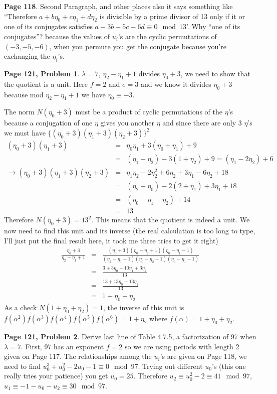 \documentclass[aps,preprint,preprintnumbers,nofootinbib,showpacs,prd]{revtex4-1}
\newcommand{\nbea}{\begin{eqnarray*}}
\newcommand{\neea}{\end{eqnarray*}}
\begin{document}
{\bf Page 118}. Second Paragraph, and other places also it says something like ``Therefore $a + b\eta_0 + c\eta_1 + d\eta_2$ is divisible by a prime divisor of 13 only if it or one of its conjugates satisfies $a - 3b - 5c - 6d \equiv 0 \mod{13}$'. Why ``one of its conjugates''? because the values of $u_i$'s are the cyclic permutations of $(-3,-5,-6)$, when you permute you get the conjugate because you're exchanging the $\eta_i$'s.

{\bf Page 121, Problem 1}. $\lambda = 7$, $\eta_2 - \eta_1 + 1$ divides $\eta_0 + 3$, we need to show that the quotient is a unit. Here $f = 2$ and $e = 3$ and we know it divides $\eta_0 + 3$ because mod $\eta_2 - \eta_1 + 1$ we have $\eta_0 \equiv -3$.

The norm $N(\eta_0 + 3)$ must be a product of cyclic permutations of the $\eta$'s because a conjugation of one $\eta$ gives you another $\eta$ and since there are only 3 $\eta$'s we must have $\{(\eta_0 + 3)(\eta_1 + 3)(\eta_2 + 3)\}^2$
%
\nbea
(\eta_0 + 3)(\eta_1 + 3) & = & \eta_0\eta_1 + 3(\eta_0 + \eta_1) + 9 \\
& = & (\eta_1 + \eta_2) - 3(1 + \eta_2) + 9 = (\eta_1 - 2\eta_2) + 6 \\
\to (\eta_0 + 3)(\eta_1 + 3)(\eta_2 + 3) & = & \eta_1\eta_2 - 2\eta_2^2 + 6\eta_2 + 3\eta_1 - 6\eta_2 + 18 \\
& = & (\eta_2 + \eta_0) -2(2 + \eta_1) + 3\eta_1 + 18 \\
& = & (\eta_0 + \eta_1 + \eta_2) + 14 \\
& = & 13
\neea
%
Therefore $N(\eta_0 + 3) = 13^2$. This means that the quotient is indeed a unit. We now need to find this unit and its inverse (the real calculation is too long to type, I'll just put the final result here, it took me three tries to get it right)
%
\nbea
\frac{\eta_0 + 3}{\eta_2 - \eta_1 + 1} & = & \frac{(\eta_0 + 3)(\eta_0 - \eta_2 + 1)(\eta_0 - \eta_1 - 1)}{(\eta_2 - \eta_1 + 1)(\eta_0 - \eta_2 + 1)(\eta_0 - \eta_1 - 1)} \\
& = & \frac{3 + 3\eta_0 - 10\eta_1 + 3\eta_2}{13} \\
& = & \frac{13 + 13\eta_0 + 13\eta_2}{13} \\
& = & 1 + \eta_0 + \eta_2
\neea
%
As a check $N(1 + \eta_0 + \eta_2) = 1$, the inverse of this unit is $f(\alpha^2)f(\alpha^3)f(\alpha^4)f(\alpha^5)f(\alpha^6) = 1 + \eta_2$ where $f(\alpha) = 1 + \eta_0 + \eta_2$.

{\bf Page 121, Problem 2}. Derive last line of Table 4.7.5, a factorization of 97 when $\lambda = 7$. First, 97 has an exponent $f = 2$ so we are using periods with length 2 given on Page 117. The relationships among the $u_i$'s are given on Page 118, we need to find $u_0^3 + u_0^2 - 2u_0 - 1 \equiv 0 \mod{97}$. Trying out different $u_0$'s (this one really tries your patience) you get $u_0 = 25$. Therefore $u_2 \equiv u_0^2 - 2 \equiv 41 \mod{97}$, $u_1 \equiv -1 -u_0 - u_2 \equiv 30 \mod{97}$.
\end{document}
